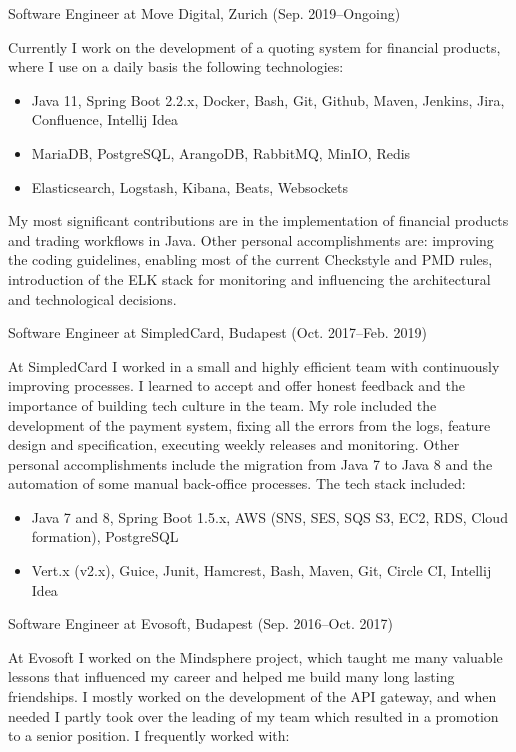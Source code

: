 \documentclass[hidelinks,11pt]{friggeri-cv}
\newenvironment{experience}{\begin{adjustwidth}{-4.6cm}{}}{\end{adjustwidth}}
\begin{document}
\begin{experience}

{\LARGE Software Engineer at Move Digital, Zurich (Sep. 2019--Ongoing)}

Currently I work on the development of a quoting system for financial products, where I use on a daily basis the following technologies:

\begin{itemize}
  \item Java 11, Spring Boot 2.2.x, Docker, Bash, Git, Github, Maven, Jenkins, Jira, Confluence, Intellij Idea
  \item MariaDB, PostgreSQL, ArangoDB, RabbitMQ, MinIO, Redis
  \item Elasticsearch, Logstash, Kibana, Beats, Websockets
\end{itemize}

My most significant contributions are in the implementation of financial products and trading workflows in Java.
Other personal accomplishments are: improving the coding guidelines, enabling most of the current Checkstyle and PMD rules, introduction of the ELK stack for monitoring and influencing the architectural and technological decisions.

{\LARGE Software Engineer at SimpledCard, Budapest (Oct. 2017--Feb. 2019)}

At SimpledCard I worked in a small and highly efficient team with continuously improving processes.
I learned to accept and offer honest feedback and the importance of building tech culture in the team.
My role included the development of the payment system, fixing all the errors from the logs, feature design and specification, executing weekly releases and monitoring.
Other personal accomplishments include the migration from Java 7 to Java 8 and the automation of some manual back-office processes. The tech stack included:

\begin{itemize}
  \item Java 7 and 8, Spring Boot 1.5.x, AWS (SNS, SES, SQS S3, EC2, RDS, Cloud formation), PostgreSQL
  \item Vert.x (v2.x), Guice, Junit, Hamcrest, Bash, Maven, Git, Circle CI, Intellij Idea
\end{itemize}

{\LARGE Software Engineer at Evosoft, Budapest (Sep. 2016--Oct. 2017)}

At Evosoft I worked on the Mindsphere project, which taught me many valuable lessons that influenced my career and helped me build many long lasting friendships.
I mostly worked on the development of the API gateway, and when needed I partly took over the leading of my team which resulted in a promotion to a senior position.
I frequently worked with:


\end{experience}
\end{document}
